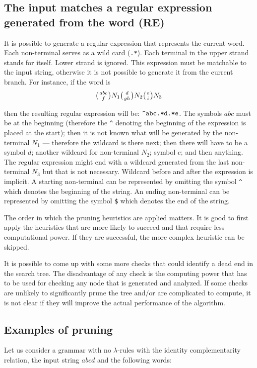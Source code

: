 \subsection{The input matches a regular expression generated from the word (RE)}
It is possible to generate a regular expression that represents the current word. Each non-terminal serves as a wild card (\verb/.*/). Each terminal in the upper strand stands for itself. Lower strand is ignored. This expression must be matchable to the input string, otherwise it is not possible to generate it from the current branch. For instance, if the word is
$$\wkpair{abc}{f}N_1\wkpair{d}{gh}N_2\wkpair{e}{i}N_3$$

then the resulting regular expression will be: $\verb/^abc.*d.*e/$. The symbols $abc$ must be at the beginning (therefore the \verb/^/ denoting the beginning of the expression is placed at the start); then it is not known what will be generated by the non-terminal $N_1$ --- therefore the wildcard is there next; then there will have to be a symbol $d$; another wildcard for non-terminal $N_2$; symbol $e$; and then anything. The regular expression might end with a wildcard generated from the last non-terminal $N_3$ but that is not necessary. Wildcard before and after the expression is implicit. A starting non-terminal can be represented by omitting the symbol \verb/^/ which denotes the beginning of the string. An ending non-terminal can be represented by omitting the symbol \verb/$/ which denotes the end of the string.

\medskip

The order in which the pruning heuristics are applied matters. It is good to first apply the heuristics that are more likely to succeed and that require less computational power. If they are successful, the more complex heuristic can be skipped.

It is possible to come up with some more checks that could identify a dead end in the search tree. The disadvantage of any check is the computing power that has to be used for checking any node that is generated and analyzed. If some checks are unlikely to significantly prune the tree and/or are complicated to compute, it is not clear if they will improve the actual performance of the algorithm.

\subsection{Examples of pruning}
Let us consider a grammar with no $\lambda$-rules with the identity complementarity relation, the input string $abcd$ and the following words:

